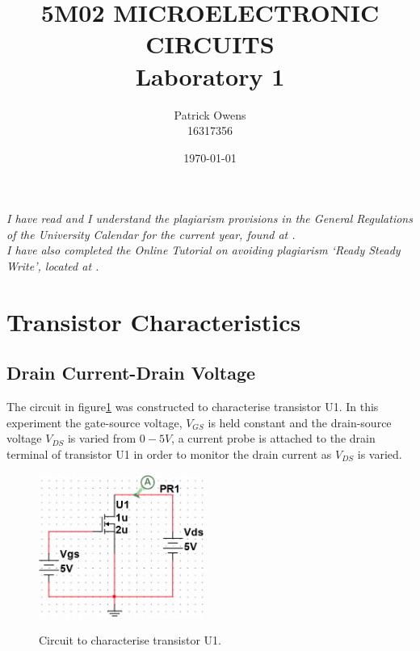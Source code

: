 \documentclass[11pt, a4paper]{article}
\begin{document}
\title{\textsc{\huge 5M02 MICROELECTRONIC CIRCUITS }\\ {\Large Laboratory 1}}
\author{Patrick Owens \\ 16317356}

\date{\today}



\maketitle

\begin{center}
\begin{minipage}[t]{0.75\linewidth}
\textit{
I have read and I understand the plagiarism provisions in the General Regulations of the University Calendar for the current year, found at . \\
I have also completed the Online Tutorial on avoiding plagiarism ‘Ready Steady Write’, located at 
.}
\end{minipage}
\end{center}

\newpage





\section{Transistor Characteristics}
\subsection{Drain Current-Drain Voltage} \label{sec:circ1}

The circuit in figure\ref{fig:circuit1} was constructed to characterise transistor U1. In this experiment the gate-source voltage, $V_{GS}$ is held constant and the drain-source voltage $V_{DS}$ is varied from $0 - 5V$, a current probe is attached to the drain terminal of transistor U1 in order to monitor the drain current as $V_{DS}$ is varied.

\begin{figure}
  \centering
    \caption{Circuit to characterise transistor U1.}
    \includegraphics[width=0.48\textwidth]{report/img/question_2/circ1.png}
    \label{fig:circuit1}
\end{figure}
\end{document}
